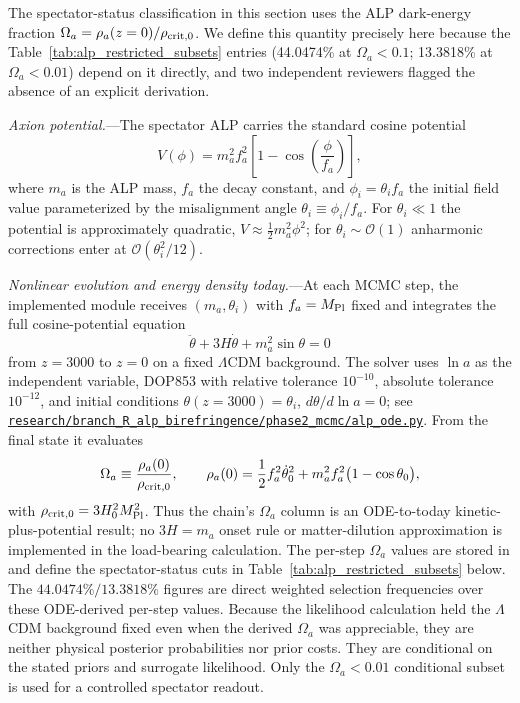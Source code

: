 \documentclass[aps,prd,twocolumn,superscriptaddress,showpacs,preprintnumbers,nofootinbib,longbibliography,floatfix]{revtex4-2}
\newcommand{\MPl}{M_{\rm Pl}}
\newcommand{\repoBase}{https://github.com/Hubify-Projects/bigbounce/blob/main}
\newcommand{\artifact}[1]{\href{\repoBase/#1}{\nolinkurl{#1}}}
\begin{document}
The spectator-status classification in this section uses the ALP dark-energy fraction
$\Omega_a = \rho_a(z=0)/\rho_{\rm crit,0}$.
We define this quantity precisely here because the Table~\ref{tab:alp_restricted_subsets}
entries (44.0474\% at $\Omega_a<0.1$; 13.3818\% at $\Omega_a<0.01$) depend on it directly,
and two independent reviewers flagged the absence of an explicit derivation.

\textit{Axion potential.}---The spectator ALP carries the standard cosine potential
\begin{equation}
V(\phi) = m_a^2 f_a^2\!\left[1 - \cos\!\left(\frac{\phi}{f_a}\right)\right],
\label{eq:alp_potential}
\end{equation}
where $m_a$ is the ALP mass, $f_a$ the decay constant, and $\phi_i = \theta_i f_a$
the initial field value parameterized by the misalignment angle $\theta_i \equiv \phi_i/f_a$.
For $\theta_i \ll 1$ the potential is approximately quadratic,
$V \approx \tfrac{1}{2}m_a^2\phi^2$; for $\theta_i\sim\mathcal{O}(1)$
anharmonic corrections enter at $\mathcal{O}(\theta_i^2/12)$.

\textit{Nonlinear evolution and energy density today.}---At each MCMC step,
the implemented module receives $(m_a,\theta_i)$ with $f_a=\MPl$ fixed and
integrates the full cosine-potential equation
\begin{equation}
\ddot\theta+3H\dot\theta+m_a^2\sin\theta=0
\label{eq:alp_full_eom}
\end{equation}
from $z=3000$ to $z=0$ on a fixed $\Lambda$CDM background. The solver uses
$\ln a$ as the independent variable, DOP853 with relative tolerance
$10^{-10}$, absolute tolerance $10^{-12}$, and initial conditions
$\theta(z=3000)=\theta_i$, $d\theta/d\ln a=0$; see
\artifact{research/branch_R_alp_birefringence/phase2_mcmc/alp_ode.py}.
From the final state it evaluates
\begin{equation}
\Omega_a \equiv \frac{\rho_a(0)}{\rho_{\rm crit,0}},\qquad
\rho_a(0)=\frac12 f_a^2\dot\theta_0^2
+m_a^2f_a^2\bigl(1-\cos\theta_0\bigr),
\label{eq:omega_a_def}
\end{equation}
with $\rho_{\rm crit,0}=3H_0^2\MPl^2$. Thus the chain's $\Omega_a$ column
is an ODE-to-today kinetic-plus-potential result; no $3H=m_a$ onset rule or
matter-dilution approximation is implemented in the load-bearing calculation.
The per-step $\Omega_a$ values are stored in
and define the spectator-status cuts in Table~\ref{tab:alp_restricted_subsets} below.
The $44.0474\%/13.3818\%$ figures are direct weighted selection frequencies
over these ODE-derived per-step values. Because the likelihood calculation held the
$\Lambda$CDM background fixed even when the derived $\Omega_a$ was appreciable,
they are neither physical posterior probabilities nor prior costs. They are
conditional on the stated priors and surrogate likelihood. Only the
$\Omega_a<0.01$ conditional subset is used for a controlled spectator readout.
\end{document}

